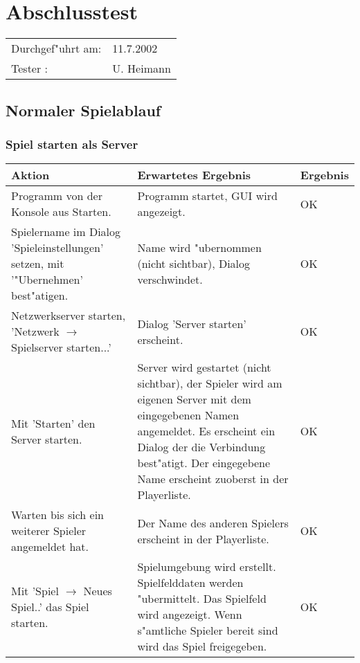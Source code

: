 \chapter{Abschlusstest}
\begin{tabular}{p{30mm}p{70mm}}
Durchgef"uhrt am: &  11.7.2002 \\
Tester          : &  U. Heimann  \\

\end{tabular}
\linebreak

\section{Normaler Spielablauf}

\subsection{Spiel starten als Server}
\begin{tabular}{|p{50mm}|p{70mm}|p{20mm}|}
\hline
\textbf{Aktion} & \textbf{Erwartetes Ergebnis} & \textbf{Ergebnis}  \\
\hline
Programm von der Konsole aus Starten.  &
Programm startet, GUI wird angezeigt.  &
OK \\
\hline
Spielername im Dialog 'Spieleinstellungen' setzen, mit '"Ubernehmen' best"atigen.  &
Name wird "ubernommen (nicht sichtbar), Dialog verschwindet.  &
OK  \\
\hline
Netzwerkserver starten, 'Netzwerk $\rightarrow$  Spielserver starten...'  &
Dialog 'Server starten' erscheint.  &
OK  \\
\hline
Mit 'Starten' den Server starten.  &
Server wird gestartet (nicht sichtbar), der Spieler wird am eigenen Server mit dem eingegebenen Namen
  angemeldet. Es erscheint ein Dialog der die Verbindung best"atigt. Der eingegebene Name erscheint
  zuoberst in der Playerliste.  &
OK \\
\hline
Warten bis sich ein weiterer Spieler angemeldet hat.  &
Der Name des anderen Spielers erscheint in der Playerliste.  &
OK  \\
\hline
Mit 'Spiel $\rightarrow$ Neues Spiel..' das Spiel starten.  &
Spielumgebung wird erstellt. Spielfelddaten werden "ubermittelt. Das Spielfeld wird angezeigt.
  Wenn s"amtliche Spieler bereit sind wird das Spiel freigegeben.  &
OK  \\
\hline
\end{tabular}

